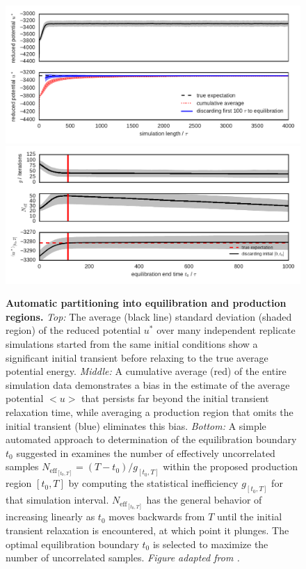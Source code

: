 \documentclass[9pt,bestpractices]{livecoms}
\begin{document}
\begin{figure}
    \centering
    \includegraphics[width=0.95\linewidth]{paper/figures2/automatic-equilibration-detection/argon-potential.pdf}
    \includegraphics[width=0.95\linewidth]{paper/figures2/automatic-equilibration-detection/argon-potential-reverse-cumulative-average.pdf}
    \caption{{\bf Automatic partitioning into equilibration and production regions.}
    \emph{Top:} The average (black line) standard deviation (shaded region) of the reduced potential $u^*$ over many independent replicate simulations started from the same initial conditions show a significant initial transient before relaxing to the true average potential energy.
    \emph{Middle:} A cumulative average (red) of the entire simulation data demonstrates a bias in the estimate of the average potential $<u>$ that persists far beyond the initial transient relaxation time, while averaging a production region that omits the initial transient (blue) eliminates this bias.
    \emph{Bottom:} A simple automated approach to determination of the equilibration boundary $t_0$ suggested in \cite{chodera2016simple} examines the number of effectively uncorrelated samples $N_\mathrm{eff}_{[t_0,T]} = (T-t_0) / g_{[t_0,T]}$ within the proposed production region $[t_0,T]$ by computing the statistical inefficiency $g_{[t_0,T]}$ for that simulation interval.
    $N_\mathrm{eff}_{[t_0,T]}$ has the general behavior of increasing linearly as $t_0$ moves backwards from $T$ until the initial transient relaxation is encountered, at which point it plunges.
    The optimal equilibration boundary $t_0$ is selected to maximize the number of uncorrelated samples.
    \emph{Figure adapted from \cite{chodera2016simple}.}
    }
    \label{fig:automatic-equilibration-detection}
\end{figure}
\end{document}
